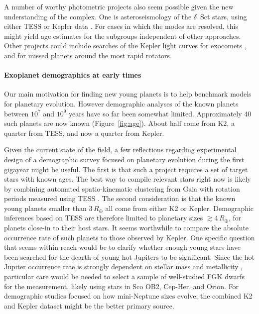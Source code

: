 \documentclass[12pt,twocolumn]{aastex63}
\begin{document}
A number of worthy photometric projects also seem possible given the
new understanding of the complex.  One is asteroseismology of the
$\delta$~Sct stars, using either TESS or Kepler data
\citep{bedding_very_2020}.  For cases in which the modes are resolved,
this might yield age estimates for the subgroups independent of other
approaches.  Other projects could include searches of the Kepler light
curves for exocomets \citep{zieba_transiting_2019}, and for missed
planets around the most rapid rotators.

\paragraph{Exoplanet demographics at early times}
Our main motivation for finding new young planets is to help benchmark models
for planetary evolution.  However demographic analyses of the known planets
between $10^7$ and $10^9$ years have so far been somewhat limited.
Approximately 40 such planets are now known (Figure~\ref{fig:age}).
About half come from K2, a quarter from TESS, and now a quarter from
Kepler.

Given the current state of the field, a few reflections regarding experimental
design of a demographic survey focused on planetary evolution during
the first gigayear might be useful.  The first is that such a project
requires a set of
target stars with known ages.  The best way to
compile relevant stars right now is likely by combining automated
spatio-kinematic clustering from Gaia with rotation periods measured using TESS
\citep[see the appendices of][]{bouma_kep1627_2022}.  The second consideration
is that the known young planets smaller than $3$\,$R_\oplus$ all come from either
K2 or Kepler.  Demographic inferences based on TESS are therefore limited to
planetary sizes $\gtrsim4$\,$R_\oplus$, for planets close-in to their host stars.  It
seems worthwhile to compare the absolute occurrence rate of such planets to
those observed by Kepler.  One specific question that seems within reach would
be to clarify whether enough young stars have been searched for the dearth of
young hot Jupiters to be significant.  Since the
hot Jupiter occurrence rate is strongly dependent on stellar mass and
metallicity \citep{petigura_metallicity_2018,petigura_cksX_2022}, particular
care would be needed to select a sample of well-studied FGK dwarfs for the
measurement, likely using stars in Sco OB2, Cep-Her, and Orion.  For
demographic studies focused on how mini-Neptune sizes evolve, the combined K2
and Kepler dataset might be the better primary source.  
\end{document}
